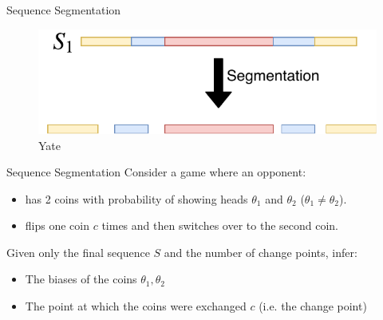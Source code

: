\documentclass{beamer}
\begin{document}
    \begin{frame}{Sequence Segmentation}
        \begin{figure}
            \centering
            \includegraphics{Segmentation.pdf}
            \caption{Yate}
            \label{fig:Segmentation}
        \end{figure}
    \end{frame}
    \begin{frame}{Sequence Segmentation}
       Consider a game where an opponent: 
        \begin{itemize}
            \item has 2 coins with probability of showing heads $\theta_1$ and $\theta_2$ ($\theta_1\neq\theta_2$).
            \item flips one coin $c$ times and then switches over to the second coin.
        
        \end{itemize}
        
        \pause 
        Given only the final sequence $S$ and the number of change points, infer:
        \begin{block}{}
            \begin{itemize}
                        \item The biases of the coins $\theta_1, \theta_2$
                        
                        \item The point at which the coins were exchanged $c$ (i.e. the change point)
                        
            \end{itemize}
        \end{block}
    \end{frame}
    
\end{document}
